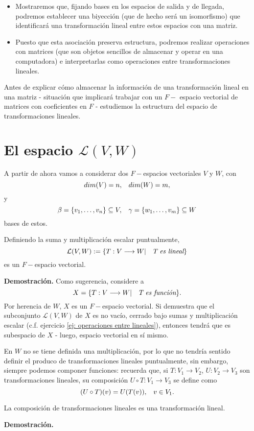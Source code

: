 \begin{itemize}
	\item Mostraremos que, 
	fijando bases en los espacios de salida y de llegada,
	podremos establecer una biyección (que de hecho será un isomorfismo)
	que identificará una transformación lineal entre estos espacios
	con una matriz. 
	\item Puesto que esta asociación preserva estructura, podremos 
	realizar operaciones con matrices (que son objetos sencillos de 
	almacenar y operar en una computadora) e interpretarlas como
	operaciones entre transformaciones lineales.
\end{itemize}

Antes de explicar cómo almacenar la información de una transformación
lineal en una matriz - situación que implicará trabajar con
un $F-$ espacio vectorial de matrices con coeficientes
en $F$ - estudiemos la estructura del espacio de transformaciones lineales. 

\section{El espacio $\mathcal{L}(V, W)$}
A partir de ahora vamos a considerar dos $F-$espacios vectoriales
$V$ y $W$, con 
\[
dim(V) = n, \hspace{0.3cm} dim(W) = m,
\]
y
\[
\beta= \{ v_{1}, \ldots , v_{n} \} \subseteq V, 
\hspace{0.3cm}
\gamma = \{ w_{1}, \ldots , v_{m} \} \subseteq W
\]
bases de estos. 

\begin{prop}
Definiendo la suma y multiplicación escalar puntualmente, 
\[
\mathcal{L} (V, W) :=
\{ T: V \longrightarrow W  | \hspace{0.2cm} \textit{ T es lineal}  \}
\]
es un $F-$espacio vectorial. 
\end{prop}
\noindent
\textbf{Demostración.}
 Como sugerencia, considere a 
\[
X = 
\{ T: V \longrightarrow W  | \hspace{0.2cm} \textit{ T es función} \}.
\]
Por herencia de $W$, $X$ es un $F-$espacio vectorial.
Si demuestra que el subconjunto $\mathcal{L}(V, W)$ de $X$
es no vacío, cerrado bajo sumas y multiplicación escalar
(c.f. ejercicio \ref{ej: operaciones entre lineales}), entonces
tendrá que es subespacio de $X$ - luego, espacio vectorial en
sí mismo.
\QEDB
\vspace{0.2cm}

En $W$ no se tiene definida una multiplicación, por lo que no tendría
sentido definir el produco de transformaciones lineales
puntualmente, sin embargo, siempre podemos componer funciones:
recuerda que, 
si $T : V_{1} \longrightarrow V_{2}$, $U: V_{2} \longrightarrow V_{3}$
son transformaciones lineales, 
su composición $ U \circ T : V_{1} \longrightarrow V_{3}$ se define como
\[
(U \circ T)(v) = U(T(v)), \hspace{0.3cm} v \in V_{1}.
\]
\begin{prop}
	La composición de transformaciones lineales es una transformación lineal.
\end{prop}
\textbf{Demostración.}
\QEDB
\vspace{0.2cm}



